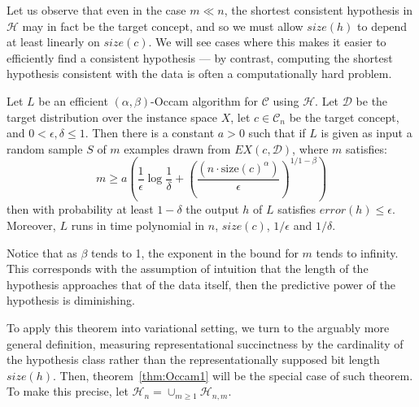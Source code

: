 Let us observe that even in the case $m\ll n$, the shortest consistent hypothesis in $\mathcal{H}$ may in fact be the target concept, and so we must allow $size(h)$ to depend at least linearly on $size(c)$. We will see cases where this makes it easier to efficiently find a consistent hypothesis --- by contrast, computing the shortest hypothesis consistent with the data is often a computationally hard problem. 

\begin{theorem}\label{thm:Occam1}
    Let $L$ be an efficient $(\alpha,\beta)$-Occam algorithm for $\mathcal{C}$ using $\mathcal{H}$. Let $\mathcal{D}$ be the target distribution over the instance space $X$, let $c\in \mathcal{C}_{n}$ be the target concept, and $0< \epsilon, \delta \leq 1$. Then there is a constant $a>0$ such that if $L$ is given as input a random sample $S$ of $m$ examples drawn from $EX(c,\mathcal{D})$, where $m$ satisfies: 
    \begin{equation}
        m \geq a \left( \frac{1}{\epsilon} \log{\frac{1}{\delta}} + \left(\frac{(n\cdot \mathrm{size}(c)^{\alpha})}{\epsilon}\right)^{1/1-\beta} \right)
    \end{equation}
    then with probability at least $1-\delta$ the output $h$ of $L$ satisfies $error(h)\leq \epsilon$. Moreover, $L$ runs in time polynomial in $n$, $size(c)$, $1/\epsilon$ and $1/\delta$.  
\end{theorem}
Notice that as $\beta$ tends to 1, the exponent in the bound for $m$ tends to infinity. This corresponds with the assumption of intuition that the length of the hypothesis approaches that of the data itself, then the predictive power of the hypothesis is diminishing. 

To apply this theorem into variational setting, we turn to the arguably more general definition, measuring representational succinctness by the cardinality of the hypothesis class rather than the representationally supposed bit length $size(h)$. Then, theorem~\ref{thm:Occam1} will be the special case of such theorem. To make this precise, let $\mathcal{H}_{n}= \cup_{m\geq 1}\mathcal{H}_{n,m}$.

